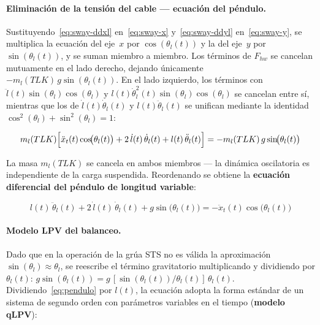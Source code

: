 \documentclass[12pt, a4paper]{article}
\begin{document}
\paragraph{Eliminación de la tensión del cable — ecuación del péndulo.}

Sustituyendo~\eqref{eq:sway-ddxl} en~\eqref{eq:sway-x} y~\eqref{eq:sway-ddyl}
en~\eqref{eq:sway-y}, se multiplica la ecuación del eje~$x$ por $\cos(\theta_l(t))$
y la del eje~$y$ por $\sin(\theta_l(t))$, y se suman miembro a miembro. Los términos
de $F_{hw}$ se cancelan mutuamente en el lado derecho, dejando únicamente
$-m_l(TLK)\,g\sin(\theta_l(t))$. En el lado izquierdo, los términos con
$\ddot{l}(t)\sin(\theta_l)\cos(\theta_l)$ y $l(t)\dot{\theta}_l^2(t)\sin(\theta_l)\cos(\theta_l)$
se cancelan entre sí, mientras que los de $\dot{l}(t)\dot{\theta}_l(t)$ y
$l(t)\ddot{\theta}_l(t)$ se unifican mediante la identidad
$\cos^2(\theta_l)+\sin^2(\theta_l)=1$:

\begin{equation}
    m_l(TLK)\Bigl[
    \ddot{x}_t(t)\cos\!\bigl(\theta_l(t)\bigr)
    + 2\,\dot{l}(t)\,\dot{\theta}_l(t)
    + l(t)\,\ddot{\theta}_l(t)
    \Bigr] = -m_l(TLK)\,g\sin\!\bigl(\theta_l(t)\bigr)
\end{equation}

La masa $m_l(TLK)$ se cancela en ambos miembros — la dinámica oscilatoria es
independiente de la carga suspendida. Reordenando se obtiene la
\textbf{ecuación diferencial del péndulo de longitud variable}:

\begin{equation}
    \label{eq:pendulo}
    l(t)\,\ddot{\theta}_l(t) + 2\,\dot{l}(t)\,\dot{\theta}_l(t)
    + g\sin\!\bigl(\theta_l(t)\bigr)
    = -\ddot{x}_t(t)\cos\!\bigl(\theta_l(t)\bigr)
\end{equation}

\paragraph{Modelo LPV del balanceo.}

Dado que en la operación de la grúa STS no es válida la aproximación
$\sin(\theta_l)\approx\theta_l$, se reescribe el término gravitatorio multiplicando
y dividiendo por $\theta_l(t)$:
$g\sin(\theta_l(t)) = g\,[\sin(\theta_l(t))/\theta_l(t)]\,\theta_l(t)$.
Dividiendo~\eqref{eq:pendulo} por $l(t)$, la ecuación adopta la forma estándar de un
sistema de segundo orden con parámetros variables en el tiempo (\textbf{modelo qLPV}):
\end{document}
